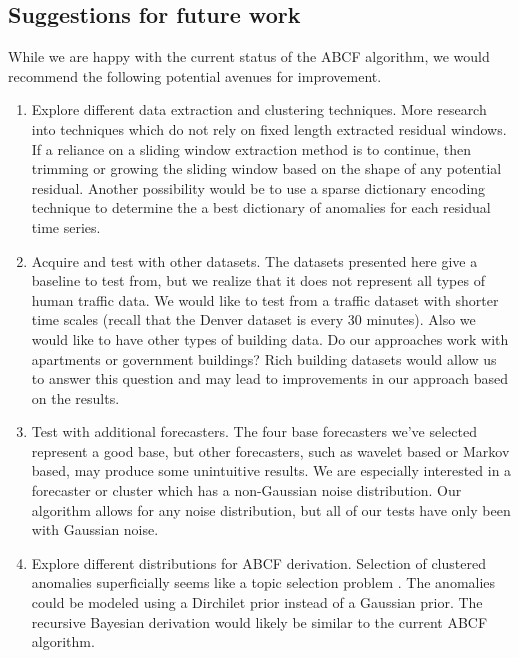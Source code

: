 \newpage


\subsection{Suggestions for future work}
While we are happy with the current status of the ABCF algorithm, we would recommend the following potential avenues for improvement.

\begin{enumerate}
	\item Explore different data extraction and clustering techniques.  More research into techniques which do not rely on fixed length extracted residual windows.  If a reliance on a sliding window extraction method is to continue, then trimming or growing the sliding window based on the shape of any potential residual.  Another possibility would be to use a sparse dictionary encoding technique to determine the a best dictionary of anomalies for each residual time series.
	
	\item Acquire and test with other datasets.  The datasets presented here give a baseline to test from, but we realize that it does not represent all types of human traffic data.  We would like to test from a traffic dataset with shorter time scales (recall that the Denver dataset is every 30 minutes).  Also we would like to have other types of building data.  Do our approaches work with apartments or government buildings?  Rich building datasets would allow us to answer this question and may lead to improvements in our approach based on the results.
	
	\item Test with additional forecasters.  The four base forecasters we've selected represent a good base, but other forecasters, such as wavelet based or Markov based, may produce some unintuitive results.  We are especially interested in a forecaster or cluster which has a non-Gaussian noise distribution.  Our algorithm allows for any noise distribution, but all of our tests have only been with Gaussian noise.
	
	\item Explore different distributions for ABCF derivation.  Selection of clustered anomalies superficially seems like a topic selection problem \cite{McNamara2007}.  The anomalies could be modeled using a Dirchilet prior instead of a Gaussian prior.  The recursive Bayesian derivation would likely be similar to the current ABCF algorithm. 
\end{enumerate}

